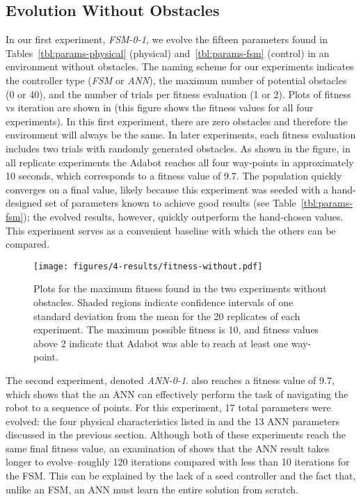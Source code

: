 \subsection{Evolution Without Obstacles}

In our first experiment, \emph{FSM-0-1}, we evolve the fifteen parameters found in Tables~\ref{tbl:params-physical} (physical) and~\ref{tbl:params-fsm} (control) in an environment without obstacles.
%
The naming scheme for our experiments indicates the controller type (\emph{FSM} or \emph{ANN}), the maximum number of potential obstacles (0 or 40), and the number of trials per fitness evaluation (1 or 2).
%
Plots of fitness vs iteration are shown in  (this figure shows the fitness values for all four experiments).
%
In this first experiment, there are zero obstacles and therefore the environment will always be the same. In later experiments, each fitness evaluation includes two trials with randomly generated obstacles.
%
As shown in the figure, in all replicate experiments the Adabot reaches all four way-points in approximately 10 seconds, which corresponds to a fitness value of 9.7.
%
The population quickly converges on a final value, likely because this experiment was seeded with a hand-designed set of parameters known to achieve good results (see Table~\ref{tbl:params-fsm}); the evolved results, however, quickly outperform the hand-chosen values.
%
This experiment serves as a convenient baseline with which the others can be compared.

\begin{figure}[!ht]
    \centering

    \texttt{[image: figures/4-results/fitness-without.pdf]}


    \caption{Plots for the maximum fitness found in the two experiments without obstacles. Shaded regions indicate confidence intervals of one standard deviation from the mean for the 20 replicates of each experiment. The maximum possible fitness is 10, and fitness values above 2 indicate that Adabot was able to reach at least one way-point.}
    \label{fig:fitness-vs-iteration}

\end{figure}


The second experiment, denoted \emph{ANN-0-1}. also reaches a fitness value of 9.7, which shows that the an ANN can effectively perform the task of navigating the robot to a sequence of points.
%
For this experiment, 17 total parameters were evolved: the four physical characteristics listed in  and the 13 ANN parameters discussed in the previous section.
%
Although both of these experiments reach the same final fitness value, an examination of  shows that the ANN result takes longer to evolve--roughly 120 iterations compared with less than 10 iterations for the FSM.
%
This can be explained by the lack of a seed controller and the fact that, unlike an FSM, an ANN must learn the entire solution from scratch.



